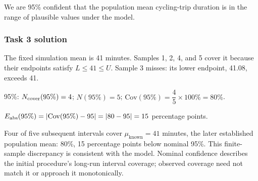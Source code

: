 \par\smallskip
{}
We are 95\% confident that the population mean cycling-trip duration is in the range of plausible values under the model.

\vspace{-3mm}
\subsubsection*{Task 3 solution}
\vspace{-3mm}
The fixed simulation mean is 41 minutes. Samples 1, 2, 4, and 5 cover it because their endpoints satisfy $L\leq41\leq U$. Sample 3 misses: its lower endpoint, 41.08, exceeds 41.
\par 95\%: $N_{\rm cover}(95\%)=4$; $N(95\%)=5$; $\mathrm{Cov}(95\%)=\dfrac45\times100\%=80\%$.
\par $E_{\rm abs}(95\%)=|\mathrm{Cov}(95\%)-95|=|80-95|=15$ percentage points.

Four of five subsequent intervals cover $\mu_{\mathrm{known}}=41$ minutes, the later established population mean: 80\%, 15 percentage points below nominal 95\%. This finite-sample discrepancy is consistent with the model. Nominal confidence describes the initial procedure's long-run interval coverage; observed coverage need not match it or approach it monotonically.


